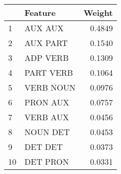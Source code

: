 \begin{tabular}{llr}
\toprule
{} &    Feature &  Weight \\
\midrule
1  &    AUX AUX &  0.4849 \\
2  &   AUX PART &  0.1540 \\
3  &   ADP VERB &  0.1309 \\
4  &  PART VERB &  0.1064 \\
5  &  VERB NOUN &  0.0976 \\
6  &   PRON AUX &  0.0757 \\
7  &   VERB AUX &  0.0456 \\
8  &   NOUN DET &  0.0453 \\
9  &    DET DET &  0.0373 \\
10 &   DET PRON &  0.0331 \\
\bottomrule
\end{tabular}
